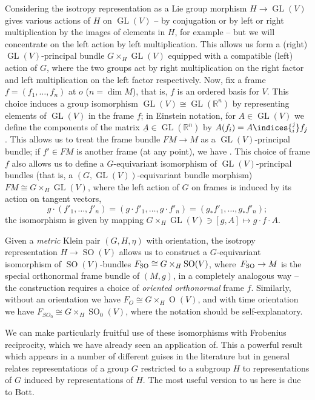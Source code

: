 \documentclass[10pt,a4paper]{amsart}
\numberwithin{equation}{section}
\newcommand{\RR}{\mathbb{R}}
\newcommand{\1}{\mathbbm{1}}
\DeclareMathOperator{\GL}{GL}
\DeclareMathOperator{\Orth}{O}
\DeclareMathOperator{\SO}{SO}
\begin{document}
Considering the isotropy representation as a Lie group morphism $H\to\GL(V)$ gives various actions of $H$ on $\GL(V)$ -- by conjugation or by left or right multiplication by the images of elements in $H$, for example -- but we will concentrate on the left action by left multiplication. This allows us form a (right) $\GL(V)$-principal bundle $G\times_H \GL(V)$ equipped with a compatible (left) action of $G$, where the two groups act by right multiplication on the right factor and left multiplication on the left factor respectively. Now, fix a frame $f=(f_1,\dots,f_n)$ at $o$ ($n=\dim M$), that is, $f$ is an ordered basis for $V$. This choice induces a group isomorphism $\GL(V)\cong\GL(\RR^n)$ by representing elements of $\GL(V)$ in the frame $f$; in Einstein notation, for $A\in\GL(V)$ we define the components of the matrix $\underline{A}\in \GL(\RR^n)$ by $A(f_i)=A\indices{^j_i}f_j$. This allows us to treat the frame bundle $FM\to M$ as a $\GL(V)$-principal bundle; if $f'\in FM$ is another frame (at any point), we have
.
This choice of frame $f$ also allows us to define a $G$-equivariant isomorphism of $\GL(V)$-principal bundles (that is, a $(G,\GL(V))$-equivariant bundle morphism)
$FM \cong G\times_H \GL(V)$,
where the left action of $G$ on frames is induced by its action on tangent vectors,
\[%
	g\cdot (f'_1,\dots,f'_n) = (g\cdot f'_1,\dots,g\cdot f'_n) = (g_*f'_1,\dots,g_*f'_n);
\]
the isomorphism is given by mapping $G\times_H \GL(V)\ni [g,A]\mapsto g\cdot f \cdot A$.

Given a \emph{metric} Klein pair $(G,H,\eta)$ with orientation, the isotropy representation $H\to\SO(V)$ allows us to construct a $G$-equivariant isomorphism of $\SO(V)$-bundles
$F_{\rm SO} \cong G\times_H \SO(V)$,
where~${F_{\rm SO}\to M}$ is the special orthonormal frame bundle of $(M,g)$, in a completely analogous way -- the construction requires a choice of \emph{oriented orthonormal} frame $f$. Similarly, without an orientation we have $F_O\cong G\times_H\Orth(V)$, and with time orientation we have $F_{SO_0}\cong G\times_H\SO_0(V)$, where the notation should be self-explanatory.

We can make particularly fruitful use of these isomorphisms with Frobenius reciprocity, which we have already seen an application of. This a powerful result which appears in a number of different guises in the literature but in general relates representations of a group $G$ restricted to a subgroup $H$ to representations of $G$ induced by representations of $H$. The most useful version to us here is due to Bott.
\end{document}
